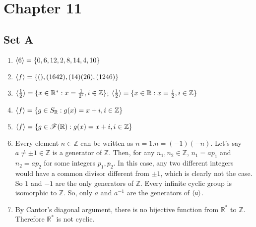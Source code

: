 \section{Chapter 11}
\subsection{Set A}
\begin{enumerate}
    \item $ \langle6\rangle = \{0, 6, 12, 2, 8, 14, 4, 10\} $

    \item $ \langle f\rangle =  \{(), (1642), (14)(26), (1246)\} $

    \item $ \langle\frac{1}{2}\rangle = \{x \in \mathbb{R}^* : x = \frac{1}{2^i},  i \in \mathbb{Z} \} $; $ \langle\frac{1}{2}\rangle = \{x \in \mathbb{R} : x = \frac{i}{2}, i \in \mathbb{Z}\}$

    \item $ \langle f\rangle = \{g \in S_\mathbb{R} : g(x) = x + i, i \in \mathbb{Z}\} $

    \item $ \langle f\rangle = \{g \in \mathscr{F}(\mathbb{R}) : g(x) = x + i, i \in \mathbb{Z}\} $

    \item Every element $ n \in \mathbb{Z} $ can be written as $ n = 1.n = (-1)(-n) $. Let's say $ a \ne \pm 1 \in \mathbb{Z} $ is a generator of $ \mathbb{Z} $. Then, for any $ n_1, n_2 \in \mathbb{Z} $, $ n_1 = ap_1 $ and $ n_2 = ap_2 $ for some integers $ p_1, p_2 $. In this case, any two different integers would have a common divisor different from $ \pm 1 $, which is clearly not the case. So $ 1 $ and $ -1 $ are the only generators of $ \mathbb{Z} $. Every infinite cyclic group is isomorphic to $ \mathbb{Z} $. So, only $ a $ and $ a^{-1} $ are the generators of $ \langle a\rangle $.

    \item By Cantor's diagonal argument, there is no bijective function from $ \mathbb{R^*} $ to $ \mathbb{Z} $. Therefore $ \mathbb{R^*} $ is not cyclic.
\end{enumerate}

